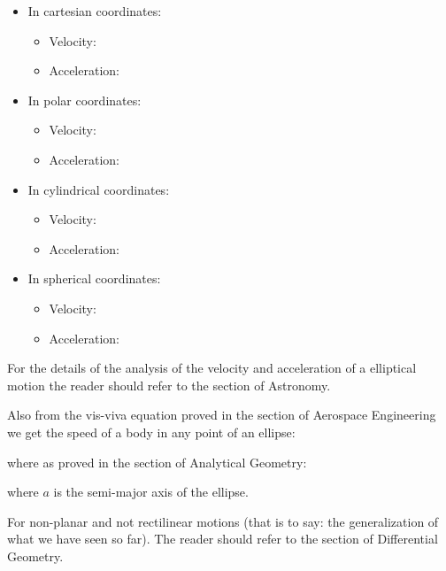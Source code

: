 	\begin{itemize}
		\item In cartesian coordinates:
			\begin{itemize}
				\item Velocity:
								
	
				\item Acceleration:
				
			\end{itemize}

		\item In polar coordinates:
			\begin{itemize}
				\item Velocity: 
				
	
				\item Acceleration: 
				
			\end{itemize}
		
		\item In cylindrical coordinates:
			\begin{itemize}
				\item Velocity:
				
	
				\item Acceleration:
				
			\end{itemize}
			
		\item In spherical coordinates:
			\begin{itemize}
				\item Velocity:
				
	
				\item Acceleration:
				
			\end{itemize}
	\end{itemize}
	For the details of the analysis of the velocity and acceleration of a elliptical motion the reader should refer to the section of Astronomy.
	
	Also from the vis-viva equation proved in the section of Aerospace Engineering we get the speed of a body in any point of an ellipse:
	
	where as proved in the section of Analytical Geometry:
	
	where $a$ is the semi-major axis of the ellipse.
	
	For non-planar and not rectilinear motions (that is to say: the generalization of what we have seen so far). The reader should refer to the section of Differential Geometry.
	
